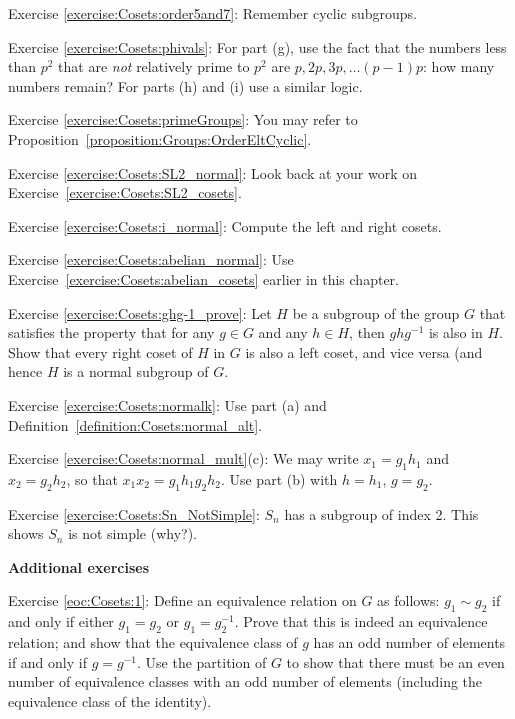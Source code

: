 \noindent Exercise \ref{exercise:Cosets:order5and7}:  Remember cyclic subgroups.

\noindent Exercise \ref{exercise:Cosets:phivals}:   For part (g), use the fact that the numbers less than $p^2$ that are \emph{not} relatively prime to $p^2$ are $p, 2p, 3p, \ldots (p-1)p$: how many numbers remain? For parts (h) and (i) use a similar logic.
 
\noindent Exercise \ref{exercise:Cosets:primeGroups}:
You may refer to Proposition~\ref{proposition:Groups:OrderEltCyclic}.

\noindent Exercise \ref{exercise:Cosets:SL2_normal}:
Look back at your work on Exercise~\ref{exercise:Cosets:SL2_cosets}.

\noindent Exercise \ref{exercise:Cosets:i_normal}:
Compute the left and right cosets.

\noindent Exercise \ref{exercise:Cosets:abelian_normal}: Use  Exercise~\ref{exercise:Cosets:abelian_cosets} earlier in this chapter.

\noindent Exercise \ref{exercise:Cosets:ghg-1_prove}: Let $H$ be a subgroup of the group $G$ that satisfies the property that  for any $g \in G$ and any $h \in H$, then $ghg^{-1}$ is also in $H$. Show that every right coset of $H$ in $G$ is also a left coset, and vice versa (and hence $H$ is a normal subgroup of $G$.

\noindent Exercise \ref{exercise:Cosets:normalk}:   Use part (a) and Definition~\ref{definition:Cosets:normal_alt}.

\noindent Exercise \ref{exercise:Cosets:normal_mult}(c):  We may write $x_1 = g_1 h_1$ and $x_2 = g_2 h_2$, so that $x_1 x_2 = g_1 h_1 g_2 h_2$.  Use part (b) with $h=h_1$, $g=g_2$.

\noindent Exercise \ref{exercise:Cosets:Sn_NotSimple}:  $S_n$ has a subgroup of index 2.  This shows $S_n$ is not simple  (why?).
\medskip

\textbf{Additional exercises}

\noindent Exercise \ref{eoc:Cosets:1}:  Define an equivalence relation on $G$ as follows: $g_1 \sim g_2$ if and only if either $g_1 = g_2$ or $g_1 = g_2^{-1}$. Prove that this is indeed an equivalence relation; and show that the equivalence class of $g$ has an odd number of elements if and only if $g = g^{-1}$. Use the partition of $G$ to show that there must be an even number of  equivalence classes with an odd number of elements (including the equivalence class of the identity).

